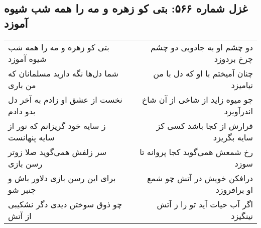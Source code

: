 \begin{center}
\section*{غزل شماره ۵۶۶: بتی کو زهره و مه را همه شب شیوه آموزد}
\label{sec:0566}
\begin{longtable}{l p{0.5cm} r}
بتی کو زهره و مه را همه شب شیوه آموزد
&&
دو چشم او به جادویی دو چشم چرخ بردوزد
\\
شما دل‌ها نگه دارید مسلمانان که من باری
&&
چنان آمیختم با او که دل با من نیامیزد
\\
نخست از عشق او زادم به آخر دل بدو دادم
&&
چو میوه زاید از شاخی از آن شاخ اندرآویزد
\\
ز سایه خود گریزانم که نور از سایه پنهانست
&&
قرارش از کجا باشد کسی کز سایه بگریزد
\\
سر زلفش همی‌گوید صلا زوتر رسن بازی
&&
رخ شمعش همی‌گوید کجا پروانه تا سوزد
\\
برای این رسن بازی دلاور باش و چنبر شو
&&
درافکن خویش در آتش چو شمع او برافروزد
\\
چو ذوق سوختن دیدی دگر نشکیبی از آتش
&&
اگر آب حیات آید تو را ز آتش نینگیزد
\\
\end{longtable}
\end{center}

